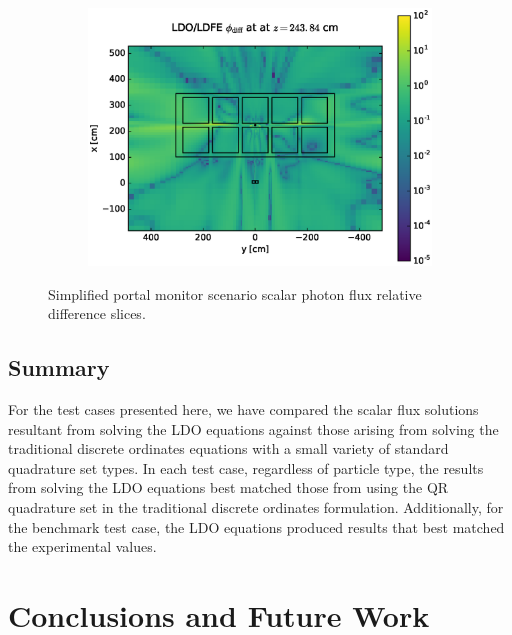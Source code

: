 \documentclass{article} %
\begin{document}
\begin{figure}[!htb]
\ContinuedFloat
\begin{subfigure}{\textwidth}
\centering
\includegraphics[max height=0.445\textheight]
{img/portal-flux-diff-ldfe.eps}
\end{subfigure}
\caption{Simplified portal monitor scenario scalar photon flux relative
         difference slices.}
\label{cargo-fwd-diff-rel}
\end{figure}

\FloatBarrier
\subsection{Summary}

For the test cases presented here, we have compared the scalar flux solutions
resultant from solving the LDO equations against those arising from solving
the traditional discrete ordinates equations with a small variety of standard
quadrature set types. In each test case, regardless of particle type, the
results from solving the LDO equations best matched those from using the QR
quadrature set in the traditional discrete ordinates formulation.
Additionally, for the benchmark test case, the LDO equations produced results
that best matched the experimental values.

\section{Conclusions and Future Work}
\label{sec:conclusions}
\end{document}

